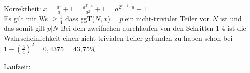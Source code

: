 \documentclass[a4paper]{scrartcl}
\begin{document}
\begin{enumerate}[a)]
Korrektheit:
$x=\frac{a^t}{a}+1= \frac{a^{2^s\cdot u}}{a^2}+1= a^{2^{s-1}\cdot u}+1$\\
Es gilt mit Ws $\geq \frac{1}{4}$ dass ggT($N, x$)$=p$ ein nicht-trivialer Teiler von $N$ ist und das somit gilt $p|N$
Bei dem zweifachen durchlaufen von den Schritten 1-4 ist die Wahrscheinlichkeit einen nicht-trivialen Teiler gefunden zu haben schon bei $1-(\frac{3}{4})^2=0,4375=43,75 \%$

Laufzeit:



\end{enumerate}
\end{document}
